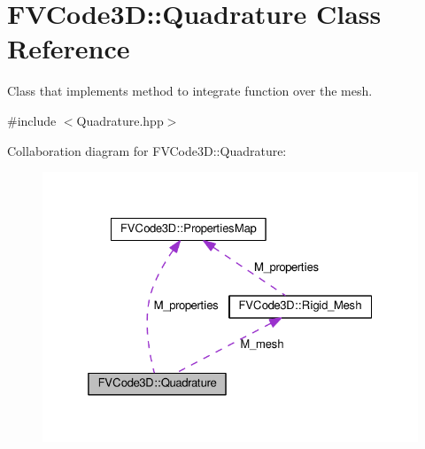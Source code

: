 \hypertarget{classFVCode3D_1_1Quadrature}{}\section{F\+V\+Code3D\+:\+:Quadrature Class Reference}
\label{classFVCode3D_1_1Quadrature}


Class that implements method to integrate function over the mesh.  




{\ttfamily \#include $<$Quadrature.\+hpp$>$}



Collaboration diagram for F\+V\+Code3D\+:\+:Quadrature\+:
\nopagebreak
\begin{figure}[H]
\begin{center}
\leavevmode
\includegraphics[width=325pt]{classFVCode3D_1_1Quadrature__coll__graph}
\end{center}
\end{figure}
